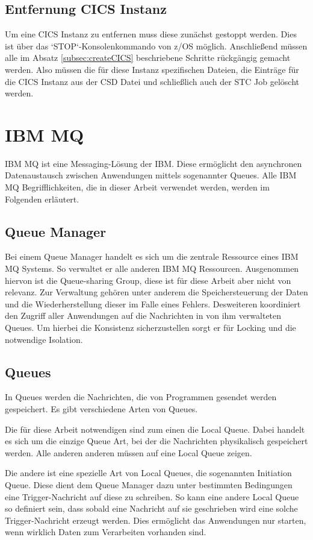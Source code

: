 \subsection{Entfernung CICS Instanz}
Um eine CICS Instanz zu entfernen muss diese zunächst gestoppt werden.
Dies ist über das `STOP`-Konsolenkommando von z/OS möglich.
Anschließend müssen alle im Absatz \ref{subsec:createCICS} beschriebene Schritte rückgängig gemacht werden.
Also müssen die für diese Instanz spezifischen Dateien, die Einträge für die CICS Instanz aus der CSD Datei und schließlich auch der STC Job gelöscht werden.

\section{IBM MQ}
IBM MQ ist eine Messaging-Lösung der IBM.
Diese ermöglicht den asynchronen Datenaustausch zwischen Anwendungen mittels sogenannter Queues.
Alle IBM MQ Begrifflichkeiten, die in dieser Arbeit verwendet werden, werden im Folgenden erläutert.
\cite{Aranha.2013}

\subsection{Queue Manager}
Bei einem Queue Manager handelt es sich um die zentrale Ressource eines IBM MQ Systems.
So verwaltet er alle anderen IBM MQ Ressourcen.
Ausgenommen hiervon ist die Queue-sharing Group, diese ist für diese Arbeit aber nicht von relevanz.
Zur Verwaltung gehören unter anderem die Speichersteuerung der Daten und die Wiederherstellung dieser im Falle eines Fehlers.
Desweiteren koordiniert den Zugriff aller Anwendungen auf die Nachrichten in von ihm verwalteten Queues.
Um hierbei die Konsistenz sicherzustellen sorgt er für Locking und die notwendige Isolation.
\cite{Aranha.2013}

\subsection{Queues}
In Queues werden die Nachrichten, die von Programmen gesendet werden gespeichert.
Es gibt verschiedene Arten von Queues.

Die für diese Arbeit notwendigen sind zum einen die Local Queue.
Dabei handelt es sich um die einzige Queue Art, bei der die Nachrichten physikalisch gespeichert werden.
Alle anderen anderen müssen auf eine Local Queue zeigen.

Die andere ist eine spezielle Art von Local Queues, die sogenannten Initiation Queue.
Diese dient dem Queue Manager dazu unter bestimmten Bedingungen eine Trigger-Nachricht auf diese zu schreiben.
So kann eine andere Local Queue so definiert sein, dass sobald eine Nachricht auf sie geschrieben wird eine solche Trigger-Nachricht erzeugt werden.
Dies ermöglicht das Anwendungen nur starten, wenn wirklich Daten zum Verarbeiten vorhanden sind.
\cite{Aranha.2013}

